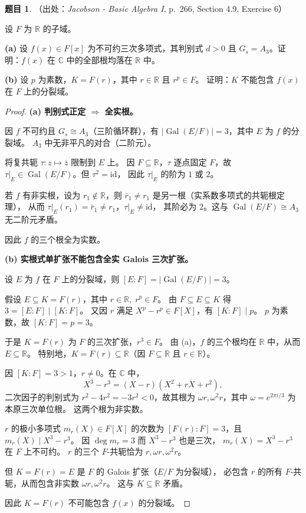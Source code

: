 \documentclass[a4paper]{ctexart}
\theoremstyle{definition}
\newtheorem{example}{题目}[section]
\theoremstyle{analysis}
\theoremstyle{plain}
\begin{document}
\begin{example}
（出处：\textit{Jacobson - Basic Algebra I}, p.~266, Section 4.9, Exercise 6）

设 \(F\) 为 \(\mathbb R\) 的子域。

\textbf{(a)} 设 \(f(x)\in F[x]\) 为不可约三次多项式，其判别式 \(d>0\) 且
\(G_s=A_3\)。证明：\(f(x)\) 在 \(\mathbb C\) 中的全部根均落在 \(\mathbb R\) 中。

\textbf{(b)} 设 \(p\) 为素数，\(K=F(r)\)，其中 \(r\in\mathbb R\) 且 \(r^p\in F\)。
证明：\(K\) 不能包含 \(f(x)\) 在 \(F\) 上的分裂域。

\begin{proof}
\textbf{(a) 判别式正定 \(\Longrightarrow\) 全实根。}

因 \(f\) 不可约且 \(G_s\cong A_3\)（三阶循环群），有
\(|\!\operatorname{Gal}(E/F)|=3\)，其中 \(E\) 为 \(f\) 的分裂域。
\(A_3\) 中无非平凡的对合（二阶元）。

将复共轭 \(\tau\colon z\mapsto\bar z\) 限制到 \(E\) 上。
因 \(F\subseteq\mathbb R\)，\(\tau\) 逐点固定 \(F\)，故
\(\tau|_E\in\operatorname{Gal}(E/F)\)。但 \(\tau^2=\mathrm{id}\)，
因此 \(\tau|_E\) 的阶为 \(1\) 或 \(2\)。

若 \(f\) 有非实根，设为 \(r_1\notin\mathbb R\)，则
\(\bar r_1\neq r_1\) 是另一根（实系数多项式的共轭根定理），
从而 \(\tau|_E(r_1)=\bar r_1\neq r_1\)，\(\tau|_E\neq\mathrm{id}\)，
其阶必为 \(2\)。这与 \(\operatorname{Gal}(E/F)\cong A_3\) 无二阶元矛盾。

因此 \(f\) 的三个根全为实数。

\textbf{(b) 实根式单扩张不能包含全实 Galois 三次扩张。}

设 \(E\) 为 \(f\) 在 \(F\) 上的分裂域，则
\([E:F]=|\!\operatorname{Gal}(E/F)|=3\)。

假设 \(E\subseteq K=F(r)\)，其中 \(r\in\mathbb R,\;r^p\in F\)。
由 \(F\subseteq E\subseteq K\) 得 \(3=[E:F]\mid[K:F]\)。
又因 \(r\) 满足 \(X^p-r^p\in F[X]\)，有 \([K:F]\mid p\)。
\(p\) 为素数，故 \([K:F]=p=3\)。

于是 \(K=F(r)\) 为 \(F\) 的三次扩张，\(r^3\in F\)。
由 (a)，\(f\) 的三个根均在 \(\mathbb R\) 中，从而 \(E\subseteq\mathbb R\)。
特别地，\(K=F(r)\subseteq\mathbb R\)（因 \(F\subseteq\mathbb R\) 且 \(r\in\mathbb R\)）。

因 \([K:F]=3>1\)，\(r\neq0\)。在 \(\mathbb C\) 中，
\[
  X^3-r^3=(X-r)(X^2+rX+r^2),
\]
二次因子的判别式为 \(r^2-4r^2=-3r^2<0\)，故其根为
\(\omega r,\omega^2 r\)，其中 \(\omega=e^{2\pi i/3}\) 为本原三次单位根。
这两个根为非实数。

\(r\) 的极小多项式 \(m_r(X)\in F[X]\) 的次数为
\([F(r):F]=3\)，且 \(m_r(X)\mid X^3-r^3\)。
因 \(\deg m_r=3\) 而 \(X^3-r^3\) 也是三次，
\(m_r(X)=X^3-r^3\) 在 \(F\) 上不可约。
\(r\) 的三个 \(F\)-共轭恰为 \(r,\omega r,\omega^2 r\)。

但 \(K=F(r)=E\) 是 \(F\) 的 Galois 扩张（\(E/F\) 为分裂域），
必包含 \(r\) 的所有 \(F\)-共轭，从而包含非实数 \(\omega r,\omega^2 r\)。
这与 \(K\subseteq\mathbb R\) 矛盾。

因此 \(K=F(r)\) 不可能包含 \(f(x)\) 的分裂域。
\end{proof}
\end{example}
\end{document}
